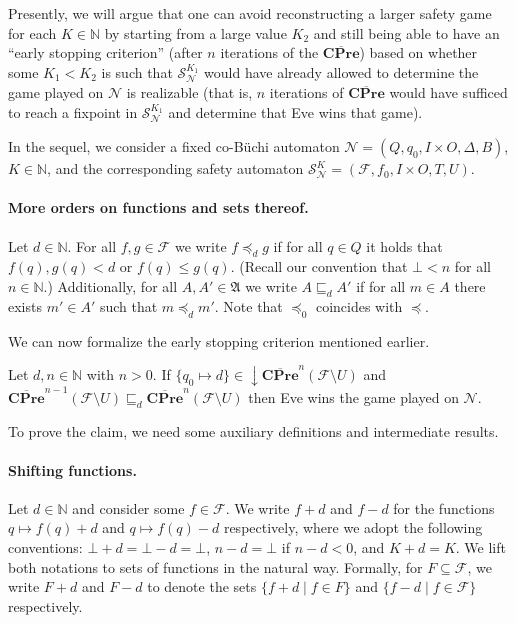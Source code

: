 \documentclass[runningheads,a4paper,draft]{llncs}
\newcommand{\cpre}{\mathbf{CPre}}
\newcommand{\calF}{\mathcal{F}}
\newcommand{\calN}{\mathcal{N}}
\newcommand{\calS}{\mathcal{S}}
\newcommand{\frakA}{\mathfrak{A}}
\newcommand{\closedn}[1]{\mathrm{\downarrow} #1}
\begin{document}
Presently, we will argue that one can avoid reconstructing a larger safety
game for each $K \in \mathbb{N}$ by starting from a large value $K_2$ and
still being able to have an ``early stopping criterion'' (after $n$ iterations
of the $\overline{\cpre}$) based on whether some $K_1 < K_2$ is such that
$\calS^{K_1}_\calN$ would have already allowed to determine the game played on
$\calN$ is realizable (that is, $n$ iterations of $\overline{\cpre}$ would
have sufficed to reach a fixpoint in $\calS^{K_1}_\calN$ and determine that
Eve wins that game).

In the sequel, we consider a fixed co-B\"uchi automaton $\calN = (Q,q_0,I
\times O, \Delta,B)$, $K
\in \mathbb{N}$, and the corresponding safety automaton $\calS^K_\calN =
(\calF,f_0,I \times O, T, U)$.

\paragraph{More orders on functions and sets thereof.} Let $d \in \mathbb{N}$.
For all $f,g \in \mathcal{F}$ we write $f \preceq_d g$ if for all $q \in Q$ it
holds that $f(q),g(q) < d$ or $f(q) \leq g(q)$. (Recall our convention that
$\bot < n$ for all $n \in \mathbb{N}$.) Additionally, for all $A,A' \in \frakA$
we write $A \sqsubseteq_d A'$ if for all $m \in A$ there exists $m' \in A'$
such that $m \preceq_d m'$. Note that $\preceq_0$ coincides with $\preceq$.

We can now formalize the early stopping criterion mentioned earlier.
\begin{theorem}\label{thm:stop-criterion}
  Let $d,n \in \mathbb{N}$ with $n > 0$.  If $\{q_0 \mapsto d\} \in
  \closedn{\overline{\cpre}^n(\calF \setminus U)}$ and
  $\overline{\cpre}^{n-1}(\calF\setminus U) \sqsubseteq_d
  \overline{\cpre}^n(\calF
  \setminus U)$ then Eve wins the game played on $\calN$.
\end{theorem}
To prove the claim, we need some auxiliary definitions and intermediate
results.

\paragraph{Shifting functions.} Let $d \in \mathbb{N}$ and consider some $f
\in \calF$. We write $f + d$ and $f - d$ for the functions $q \mapsto f(q) +
d$ and $q \mapsto f(q) - d$ respectively, where we adopt the following
conventions: $\bot + d = \bot - d = \bot$, $n - d = \bot$ if $n - d < 0$, and
$K + d = K$. We lift both notations to sets of functions in the natural way.
Formally, for $F \subseteq \calF$, we write $F + d$ and $F - d$ to denote the
sets $\{f + d \mid f \in F\}$ and $\{f - d \mid f \in \calF\}$ respectively.
\end{document}
